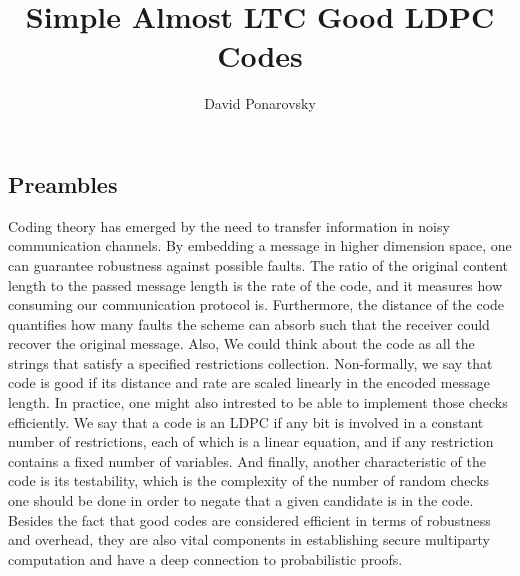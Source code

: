 \documentclass{article}
\begin{document}
\title{Simple Almost LTC Good LDPC Codes} 
\author{David Ponarovsky}
\maketitle
{} 
\begin{multicols*}{2}
  \section{Preambles}Coding theory has emerged by the need to transfer information in noisy communication channels. By embedding a message in higher dimension space, one can guarantee robustness against possible faults. The ratio of the original content length to the passed message length is the rate of the code, and it measures how consuming our communication protocol is. Furthermore, the distance of the code quantifies how many faults the scheme can absorb such that the receiver could recover the original message. Also, We could think about the code as all the strings that satisfy a specified restrictions collection.
 Non-formally, we say that code is good if its distance and rate are scaled linearly in the encoded message length.  In practice, one might also intrested to be able to implement those checks efficiently. We say that a code is an LDPC if any bit is involved in a constant number of restrictions, each of which is a linear equation, and if any restriction contains a fixed number of variables. And finally, another characteristic of the code is its testability, which is the complexity of the number of random checks one should be done in order to negate that a given candidate is in the code.
Besides the fact that good codes are considered efficient in terms of robustness and overhead, they are also vital components in establishing secure multiparty computation \cite{MultiParty} and have a deep connection to probabilistic proofs.


\end{multicols*}
\end{document}
